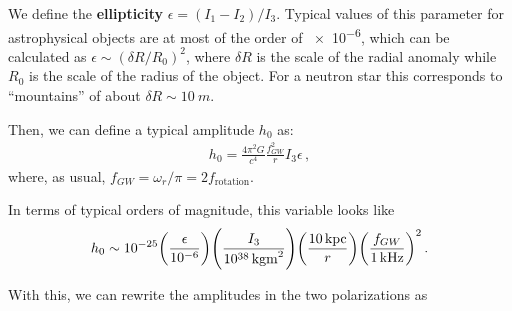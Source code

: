 \documentclass[main.tex]{subfiles}
\begin{document}

We define the \textbf{ellipticity} \(\epsilon = (I_1 - I_2 ) / I_3 \). Typical values of this parameter for astrophysical objects are at most of the order of \num{e-6}, which can be calculated as \(\epsilon \sim ( \delta R / R_0 )^2\), where \(\delta R\) is the scale of the radial anomaly while  \(R_0 \) is the scale of the radius of the object.
For a neutron star this corresponds to ``mountains'' of about \(\delta R \sim \SI{10}{m}\).

Then, we can define a typical amplitude \(h_0 \) as: 
%
\begin{align}
h_0 = \frac{4 \pi^2G}{c^{4}} \frac{f_{GW}^2}{r} I_3 \epsilon 
\,,
\end{align}
%
where, as usual, \(f_{GW} = \omega_{r} / \pi = 2 f _{\text{rotation}}\).

In terms of typical orders of magnitude, this variable looks like
%
\begin{align}
h_0 \sim \num{e-25} \qty(\frac{\epsilon }{\num{e-6}})
\qty( \frac{I_3}{\SI{e38}{kg m^2}})
\qty( \frac{\SI{10}{kpc}}{r})
\qty( \frac{f_{GW}}{\SI{1}{kHz}})^2
\,.
\end{align}

With this, we can rewrite the amplitudes in the two polarizations as 
%
\end{document}
